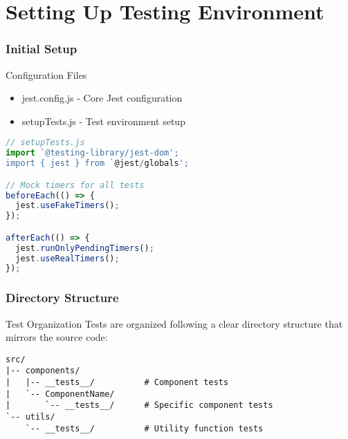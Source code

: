 \documentclass{beamer}
\begin{document}
\section{Setting Up Testing Environment}
\begin{frame}[fragile]
    \frametitle{Initial Setup}
    \begin{block}{Configuration Files}
        \begin{itemize}
            \item jest.config.js - Core Jest configuration
            \item setupTests.js - Test environment setup
        \end{itemize}
    \end{block}
    
    \begin{lstlisting}[language=JavaScript]
// setupTests.js
import `@testing-library/jest-dom';
import { jest } from `@jest/globals';

// Mock timers for all tests
beforeEach(() => {
  jest.useFakeTimers();
});

afterEach(() => {
  jest.runOnlyPendingTimers();
  jest.useRealTimers();
});
    \end{lstlisting}
\end{frame}

\begin{frame}[fragile]
    \frametitle{Directory Structure}
    \begin{block}{Test Organization}
        Tests are organized following a clear directory structure that mirrors the source code:
    \end{block}
    
    \begin{lstlisting}[basicstyle=\ttfamily\small]
src/
|-- components/
|   |-- __tests__/          # Component tests
|   `-- ComponentName/
|       `-- __tests__/      # Specific component tests
`-- utils/
    `-- __tests__/          # Utility function tests
    \end{lstlisting}
\end{frame}
\end{document}
